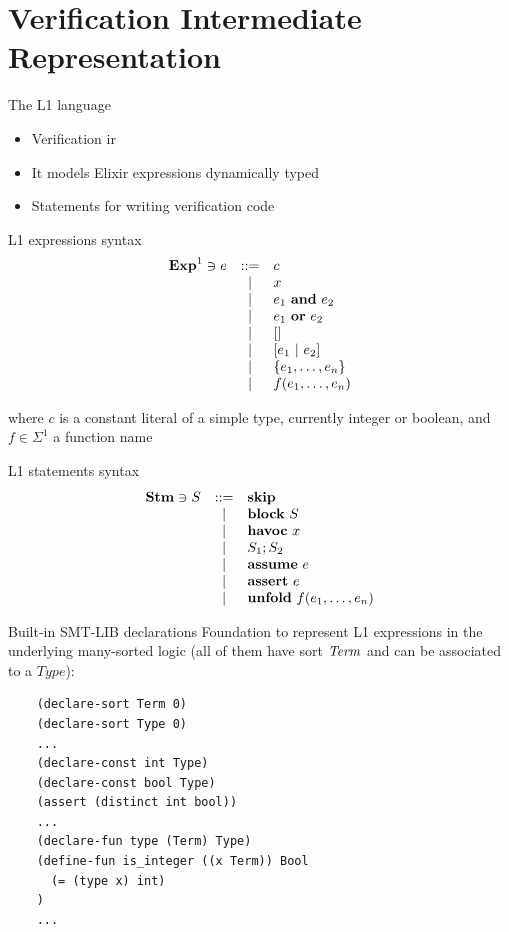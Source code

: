 \documentclass{beamer}
\begin{document}
  \section{Verification Intermediate Representation}
  \begin{frame}{The L1 language}
    \begin{itemize}
      \item \pause Verification \gls*{ir} 
      \item \pause It models Elixir expressions dynamically typed
      \item \pause Statements for writing verification code
    \end{itemize}
  \end{frame}
  \begin{frame}{L1 expressions syntax}
    \[
      \begin{array}{rcll}
        \mathbf{Exp}^{1} \ni e & ::= & c \\
        & | & x \\
        & | & e_1~\textbf{and}~e_2 \\
        & | & e_1~\textbf{or}~e_2 \\
        & | & [] \\
        & | & [e_1~|~e_2] \\
        & | & \{e_1, \ldots, e_n\} \\
        & | & f(e_1, \ldots, e_n) \\
      \end{array}
    \]

    \pause where $c$ is a constant literal of a simple type, currently integer or 
    boolean, and $f \in \Sigma^1$ a function name
  \end{frame}
  \begin{frame}{L1 statements syntax}
    \[
      \begin{array}{rcll}
        \mathbf{Stm} \ni S & ::= & \textbf{skip} \\
        & | & \textbf{block}~S \\
        & | & \textbf{havoc}~x \\
        & | & S_1;S_2 \\
        & | & \textbf{assume}~e \\
        & | & \textbf{assert}~e \\
        & | & \textbf{unfold}~f(e_1, \dots, e_n) \\
      \end{array}
    \]
  \end{frame}
  \begin{frame}[fragile]{Built-in SMT-LIB declarations}
    Foundation to represent L1 expressions in the underlying many-sorted logic
    (all of them have sort $\mathit{Term}$ and can be associated to a $\mathit{Type}$):

    \pause

    \small
    \begin{verbatim}
    (declare-sort Term 0)
    (declare-sort Type 0)
    ...
    (declare-const int Type)
    (declare-const bool Type)
    (assert (distinct int bool))
    ...
    (declare-fun type (Term) Type)
    (define-fun is_integer ((x Term)) Bool 
      (= (type x) int)
    )
    ...
    \end{verbatim}
  \end{frame}
\end{document}

